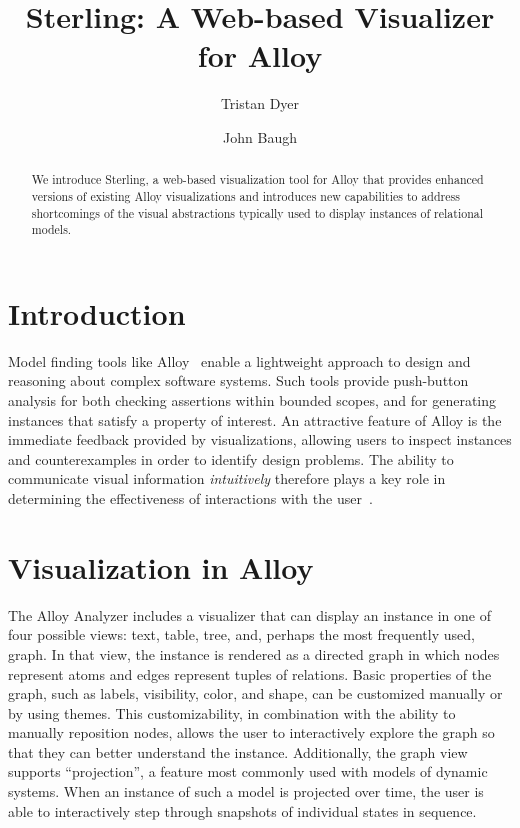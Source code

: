 \documentclass[runningheads]{llncs}
\begin{document}
\title{Sterling: A Web-based Visualizer for Alloy}
\author{Tristan Dyer  \and John Baugh }



\maketitle

\begin{abstract}
We introduce Sterling, a web-based visualization tool for Alloy that provides enhanced versions of existing Alloy visualizations and introduces new capabilities to address shortcomings of the visual abstractions typically used to display instances of relational models. 
\end{abstract}

\section{Introduction}
\label{introduction}

Model finding tools like Alloy~\cite{jackson2012} enable a lightweight approach to design and reasoning about complex software systems. Such tools provide push-button analysis for both checking assertions within bounded scopes, and for generating instances that satisfy a property of interest. An attractive feature of Alloy is the immediate feedback provided by visualizations, allowing users to inspect instances and counterexamples in order to identify design problems. The ability to communicate visual information \emph{intuitively} therefore plays a key role in determining the effectiveness of interactions with the user~\cite{gammaitoni2014}.

\section{Visualization in Alloy}
\label{alloy-vis}

The Alloy Analyzer includes a visualizer that can display an instance in one of four possible views: text, table, tree, and, perhaps the most frequently used, graph. In that view, the instance is rendered as a directed graph in which nodes represent atoms and edges represent tuples of relations. Basic properties of the graph, such as labels, visibility, color, and shape, can be customized manually or by using themes.
This customizability, in combination with the ability to manually reposition nodes, allows the user to interactively explore the graph so that they can better understand the instance. 
Additionally, the graph view supports ``projection'', a feature most commonly used with models of dynamic systems. When an instance of such a model is projected over time, the user is able to interactively step through snapshots of individual states in sequence.
\end{document}
